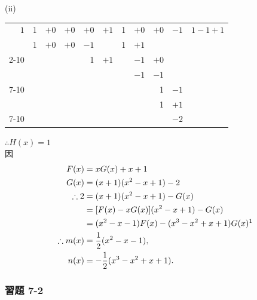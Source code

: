 \begin{example}
(ii)
\begin{center}
\renewcommand{\arraystretch}{1.2}
\begin{tabular}{r|rrrrr|rrrr|l}
$1$ & 1 & $+0$ & $+0$ & $+0$ & $+1$ & 1 & $+0$ & $+0$ & $-1$ & $1-1+1$ \\
    & 1 & $+0$ & $+0$ & $-1$ &      & 1 & $+1$ &      &      & \\ \cline{2-10}
    &   &      &      & 1    & $+1$ &   & $-1$ & $+0$ &      & \\
    &   &      &      &      &      &   & $-1$ & $-1$ &      & \\ \cline{7-10}
    &   &      &      &      &      &   &      & 1    & $-1$ & \\
    &   &      &      &      &      &   &      & 1    & $+1$ & \\ \cline{7-10}
    &   &      &      &      &      &   &      &      & $-2$ &
\end{tabular}
\end{center}
$\therefore H(x) = 1$\\
因
\begin{align*}
  F(x) &= xG(x) + x+1 \\
  G(x) &= (x+1)(x^2-x+1) - 2 \\
  \therefore 2 &= (x+1)(x^2-x+1) - G(x) \\
  &= [F(x)-xG(x)](x^2-x+1) - G(x) \\
  &= (x^2-x-1)F(x) - (x^3-x^2+x+1)G(x)\footnotemark \\
  \therefore m(x) &= \frac{1}{2}(x^2-x-1), \\
  n(x) &= -\frac{1}{2}(x^3-x^2+x+1).
\end{align*}
\end{example}

\subsubsection*{習題 7-2}\label{sec:ex7-2}

